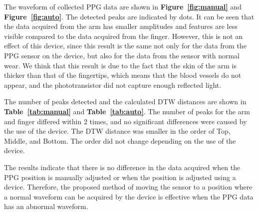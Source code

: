\documentclass[sigconf]{acmart}
\newcommand\figref[1]{\textbf{Figure~\ref{fig:#1}}}
\newcommand\tabref[1]{\textbf{Table~\ref{tab:#1}}}
\begin{document}
The waveform of collected PPG data are shown in \figref{manual} and \figref{auto}. The detected peaks are indicated by dots. It can be seen that the data acquired from the arm has smaller amplitudes and features are less visible compared to the data acquired from the finger. However, this is not an effect of this device, since this result is the same not only for the data from the PPG sensor on the device, but also for the data from the sensor with normal wear. We think that this result is due to the fact that the skin of the arm is thicker than that of the fingertips, which means that the blood vessels do not appear, and the phototransistor did not capture enough reflected light.\par

The number of peaks detected and the calculated DTW distances are shown in \tabref{manual} and \tabref{auto}. The number of peaks for the arm and finger differed within 2 times, and no significant differences were caused by the use of the device. The DTW distance was smaller in the order of Top, Middle, and Bottom. The order did not change depending on the use of the device.\par

The results indicate that there is no difference in the data acquired when the PPG position is manually adjusted or when the position is adjusted using a device. Therefore, the proposed method of moving the sensor to a position where a normal waveform can be acquired by the device is effective when the PPG data has an abnormal waveform.
\end{document}
